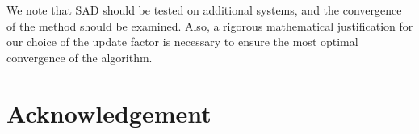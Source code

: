 \documentclass[letterpaper,twocolumn,amsmath,amssymb,pre,aps,10pt]{revtex4-1}
\newcommand{\blue}[1]{{\bf \color{blue} #1}}
\newcommand{\jpsays}[1]{{\color{red} [\blue{Jordan:} \emph{#1}]}}
\begin{document}
We note that SAD should be tested on additional systems, and the
convergence of the method should be examined.  Also, a rigorous
mathematical justification for our choice of the update factor is
necessary to ensure the most optimal convergence of the algorithm.

\section{Acknowledgement}




\end{document}
